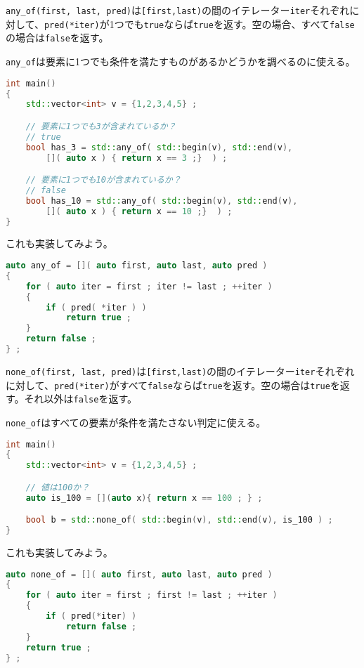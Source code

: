 \texttt{any\_of(first, last, pred)}は\texttt{[first,last)}の間のイテレーター\texttt{iter}それぞれに対して、\texttt{pred(*iter)}が1つでも\texttt{true}ならば\texttt{true}を返す。空の場合、すべて\texttt{false}の場合は\texttt{false}を返す。

\texttt{any\_of}は要素に1つでも条件を満たすものがあるかどうかを調べるのに使える。

\begin{lstlisting}[language={C++}]
int main()
{
    std::vector<int> v = {1,2,3,4,5} ;

    // 要素に1つでも3が含まれているか？
    // true
    bool has_3 = std::any_of( std::begin(v), std::end(v),
        []( auto x ) { return x == 3 ;}  ) ;

    // 要素に1つでも10が含まれているか？
    // false
    bool has_10 = std::any_of( std::begin(v), std::end(v),
        []( auto x ) { return x == 10 ;}  ) ;
}
\end{lstlisting}

これも実装してみよう。

\begin{lstlisting}[language={C++}]
auto any_of = []( auto first, auto last, auto pred )
{
    for ( auto iter = first ; iter != last ; ++iter )
    {
        if ( pred( *iter ) )
            return true ;
    }
    return false ;
} ;
\end{lstlisting}

\texttt{none\_of(first, last, pred)}は\texttt{[first,last)}の間のイテレーター\texttt{iter}それぞれに対して、\texttt{pred(*iter)}がすべて\texttt{false}ならば\texttt{true}を返す。空の場合は\texttt{true}を返す。それ以外は\texttt{false}を返す。

\texttt{none\_of}はすべての要素が条件を満たさない判定に使える。

\begin{lstlisting}[language={C++}]
int main()
{
    std::vector<int> v = {1,2,3,4,5} ;

    // 値は100か？
    auto is_100 = [](auto x){ return x == 100 ; } ;

    bool b = std::none_of( std::begin(v), std::end(v), is_100 ) ;
}
\end{lstlisting}

これも実装してみよう。

\begin{lstlisting}[language={C++}]
auto none_of = []( auto first, auto last, auto pred )
{
    for ( auto iter = first ; first != last ; ++iter )
    {
        if ( pred(*iter) )
            return false ;
    }
    return true ;
} ;
\end{lstlisting}

